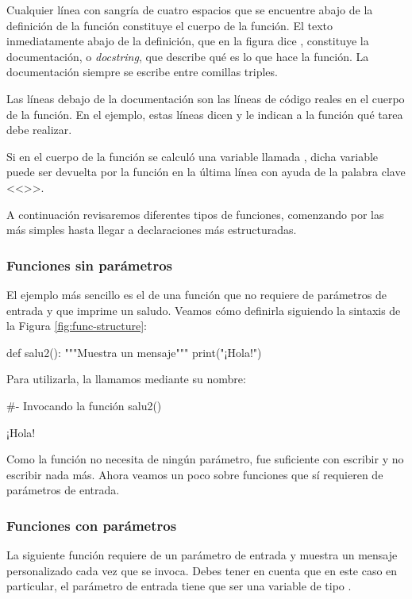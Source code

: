 Cualquier línea con sangría de cuatro espacios que se encuentre abajo de la definición de la función constituye el cuerpo de la función. El texto inmediatamente abajo de la definición, que en la figura dice , constituye la documentación, o \emph{docstring}, que describe qué es lo que hace la función. La documentación siempre se escribe entre comillas triples. 

Las líneas debajo de la documentación son las líneas de código reales en el cuerpo de la función. En el ejemplo, estas líneas dicen  y le indican a la función qué tarea debe realizar.

Si en el cuerpo de la función se calculó una variable llamada , dicha variable puede ser devuelta por la función en la última línea con ayuda de la palabra clave <<>>.

A continuación revisaremos diferentes tipos de funciones, comenzando por las más simples hasta llegar a declaraciones más estructuradas.

\subsubsection{Funciones sin parámetros}
El ejemplo más sencillo es el de una función que no requiere de parámetros de entrada y que imprime un saludo. Veamos cómo definirla siguiendo la sintaxis de la Figura \ref{fig:func-structure}:

\begin{pyin}
def salu2():
    """Muestra un mensaje"""
    print("¡Hola!")
\end{pyin}

Para utilizarla, la llamamos mediante su nombre:
\begin{pyin}[]
#- Invocando la función
salu2()
\end{pyin}
\begin{pyout}
¡Hola!
\end{pyout}

Como la función no necesita de ningún parámetro, fue suficiente con escribir  y no escribir nada más. Ahora veamos un poco sobre funciones que sí requieren de parámetros de entrada.

\subsubsection{Funciones con parámetros}
La siguiente función requiere de un parámetro de entrada y muestra un mensaje personalizado cada vez que se invoca. Debes tener en cuenta que en este caso en particular, el parámetro de entrada tiene que ser una variable de tipo .

